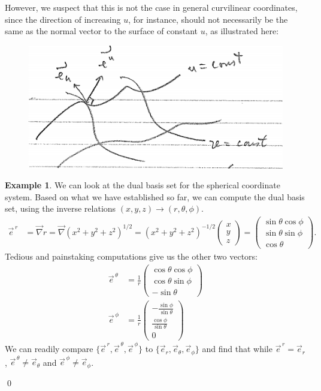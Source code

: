 \documentclass{book}
\theoremstyle{definition}
\newtheorem{exmp}{Example}[section]
\begin{document}
However, we suspect that this is not the case in general curvilinear coordinates, since the direction of increasing $u$, for instance, should not necessarily be the same as the normal vector to the surface of constant $u$, as illustrated here:
\begin{figure}[!htb]
	\centering
	\includegraphics[scale=0.6]{curvi}
\end{figure}
\begin{exmp}
We can look at the dual basis set for the spherical coordinate system. Based on what we have established so far, we can compute the dual basis set, using the inverse relations $(x,y,z) \rightarrow (r,\theta,\phi)$.
\begin{align*}
\vec{e}^{\,r} &= \vec{\nabla}r = \vec{\nabla}(x^2+y^2+z^2)^{1/2} = (x^2+y^2+z^2)^{-1/2}\begin{pmatrix}x\\y\\z\end{pmatrix} = \begin{pmatrix}\sin\theta\cos\phi\\ \sin\theta\sin\phi\\ \cos\theta\end{pmatrix}.
\end{align*}
Tedious and painstaking computations give us the other two vectors:
\begin{align*}
\vec{e}^{\,\theta} &= \frac{1}{r}\begin{pmatrix} \cos\theta\cos\phi \\ \cos\theta\sin\phi \\ -\sin\theta \end{pmatrix}\\
\vec{e}^{\,\phi} &= \frac{1}{r}\begin{pmatrix} -\frac{\sin\phi}{\sin\theta} \\ \frac{\cos\phi}{\sin\theta} \\ 0\end{pmatrix}
\end{align*}
We can readily compare $\{ \vec{e}^{\,r}, \vec{e}^{\,\theta}, \vec{e}^{\,\phi} \}$ to $\{ \vec{e}_{r}, \vec{e}_\theta, \vec{e}_\phi \}$ and find that while $\vec{e}^{\,r} = \vec{e}_{r}$, $\vec{e}^{\,\theta} \neq \vec{e}_{\theta}$ and $\vec{e}^{\,\phi} \neq \vec{e}_{\phi}$.
\end{exmp}\qed
\end{document}

